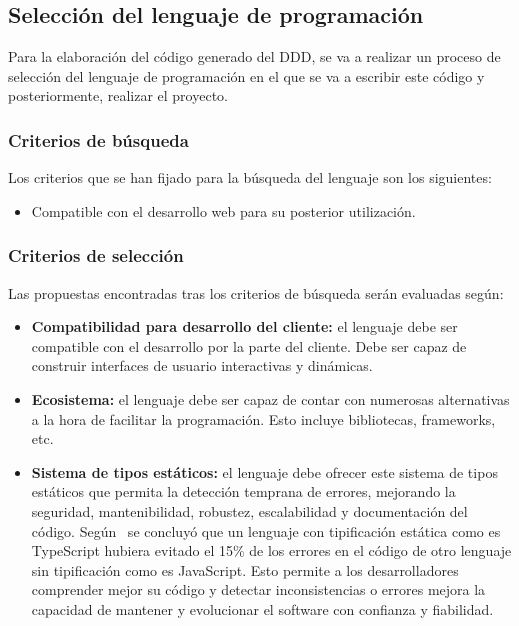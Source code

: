 \subsection{Selección del lenguaje de programación}

Para la elaboración del código generado del DDD, se va a realizar un proceso de selección del lenguaje de programación en el que se va a escribir este código y posteriormente, realizar el proyecto.

\subsubsection{Criterios de búsqueda}

Los criterios que se han fijado para la búsqueda del lenguaje son los siguientes:

\begin{itemize}
    \item Compatible con el desarrollo web para su posterior utilización.
\end{itemize}

\subsubsection{Criterios de selección}

Las propuestas encontradas tras los criterios de búsqueda serán evaluadas según:

\begin{itemize}
    \item \textbf{Compatibilidad para desarrollo del cliente:} el lenguaje debe ser compatible con el desarrollo por la parte del cliente. Debe ser capaz de construir interfaces de usuario interactivas y dinámicas.
    \item \textbf{Ecosistema:} el lenguaje debe ser capaz de contar con numerosas alternativas a la hora de facilitar la programación. Esto incluye bibliotecas, frameworks, etc.
    \item \textbf{Sistema de tipos estáticos:} el lenguaje debe ofrecer este sistema de tipos estáticos que permita la detección temprana de errores, mejorando la seguridad, mantenibilidad, robustez, escalabilidad y documentación del código. Según~\cite{gao2017type} se concluyó que un lenguaje con tipificación estática como es TypeScript hubiera evitado el 15\% de los errores en el código de otro lenguaje sin tipificación como es JavaScript. Esto permite a los desarrolladores comprender mejor su código y detectar inconsistencias o errores mejora la capacidad de mantener y evolucionar el software con confianza y fiabilidad.
\end{itemize}


